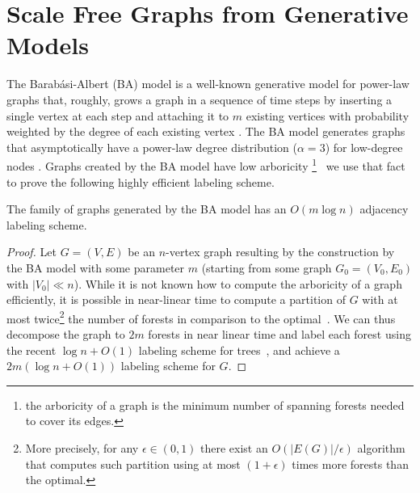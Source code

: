 \section{Scale Free  Graphs from Generative Models}\label{Sec:ScaleFree}
The Barab{\'a}si-Albert (BA) model is a well-known generative model for power-law graphs that, roughly, grows a graph in a sequence of time steps by
inserting a single vertex at each step and attaching it to $m$ existing vertices with probability weighted by the degree of each existing vertex \cite{barabasi1999emergence}. The BA model
generates graphs that asymptotically have a power-law degree distribution ($\alpha = 3$) for low-degree nodes \cite{DBLP:journals/rsa/BollobasRST01}.
Graphs created by the BA model have low arboricity \footnote{the arboricity of a graph is the minimum number of spanning forests needed to cover its edges.}~\cite{goel2006bounded} we use
that fact to prove the following highly efficient labeling scheme. 



\begin{proposition}\label{Th:baLabeling}
The family of graphs generated by the BA model has an $O(m \log n)$ adjacency labeling scheme.
\end{proposition}

\begin{proof}
Let  $G=(V,E)$  be an $n$-vertex graph resulting by the construction  by the BA model with some parameter $m$ (starting from some graph $G_0 = (V_0,E_0)$ with $\vert V_0 \vert \ll n$).
While it is not known how to compute the   arboricity of a graph efficiently, it is possible in near-linear time to compute a partition of $G$ with  at most twice\footnote{More precisely, for any $\epsilon \in (0,1)$  there exist an $O(|E(G)| / \epsilon)$ algorithm~\cite{kowalik2006approximation} that computes such partition using at most $(1+ \epsilon)$ times more forests than the optimal.} the number of forests in comparison to the optimal~\cite{arikati1997efficient}.
We can thus decompose the graph to $2m$ forests in near linear time and label each forest using the recent $\log n + O(1)$ labeling scheme for trees~\cite{alstrup2015optimal},  and achieve a $2m (\log n+O(1))$ labeling scheme for $G$.
\end{proof}


